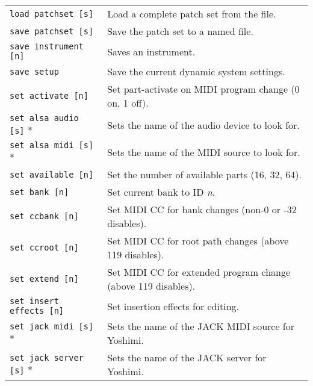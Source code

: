 \begin{table}[H]
\begin{tabular}{l l}
         \texttt{load patchset [s]} &
            Load a complete patch set from the file. \\

         \texttt{save patchset [s]} &
            Save the patch set to a named file. \\

         \texttt{save instrument [n]} &
            Saves an instrument. \\

         \texttt{save setup} &
            Save the current dynamic system settings. \\

         \texttt{set activate [n]} &
            Set part-activate on MIDI program change (0 on, 1 off). \\

         \texttt{set alsa audio [s]} * &
            Sets the name of the audio device to look for. \\

         \texttt{set alsa midi [s]} * &
            Sets the name of the MIDI source to look for. \\

         \texttt{set available [n]} &
            Set the number of available parts (16, 32, 64). \\

         \texttt{set bank [n]} &
            Set current bank to ID \textsl{n}. \\

         \texttt{set ccbank [n]} &
            Set MIDI CC for bank changes (non-0 or -32 disables). \\

         \texttt{set ccroot [n]} &
            Set MIDI CC for root path changes (above 119 disables). \\

         \texttt{set extend [n]} &
            Set MIDI CC for extended program change (above 119 disables). \\

         \texttt{set insert effects [n]} &
            Set insertion effects for editing. \\

         \texttt{set jack midi [s]} * &
            Sets the name of the JACK MIDI source for Yoshimi. \\

         \texttt{set jack server [s]} * &
            Sets the name of the JACK server for Yoshimi. \\


\end{tabular}
\end{table}
